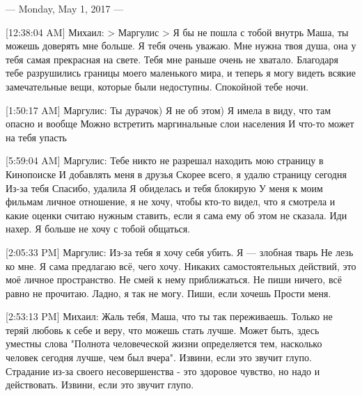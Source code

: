 \documentclass{article}
\begin{document}
\title{}
\author{}
\date{}
\maketitle


--- Monday, May 1, 2017 ---

[12:38:04 AM] Михаил:
> Маргулис
> Я бы не пошла с тобой внутрь
Маша, ты можешь доверять мне больше. Я тебя очень уважаю. Мне нужна твоя душа, она у тебя самая прекрасная на свете. Тебя мне раньше очень не хватало. Благодаря тебе разрушились границы моего маленького мира, и теперь я могу видеть всякие замечательные вещи, которые были недоступны.
 Спокойной тебе ночи.

[1:50:17 AM] Маргулис:
Ты дурачок)
 Я не об этом)
 Я имела в виду, что там опасно и вообще
 Можно встретить маргинальные слои населения
 И что-то может на тебя упасть

[5:59:04 AM] Маргулис:
Тебе никто не разрешал находить мою страницу в Кинопоиске
 И добавлять меня в друзья
 Скорее всего, я удалю страницу сегодня
 Из-за тебя
 Спасибо, удалила
 Я обиделась и тебя блокирую
 У меня к моим фильмам личное отношение, я не хочу, чтобы кто-то видел, что я смотрела и какие оценки считаю нужным ставить, если я сама ему об этом не сказала. Иди нахер. Я больше не хочу с тобой общаться.

[2:05:33 PM] Маргулис:
Из-за тебя я хочу себя убить.
 Я — злобная тварь
 Не лезь ко мне. Я сама предлагаю всё, чего хочу. Никаких самостоятельных действий, это моё личное пространство. Не смей к нему приближаться.
 Не пиши ничего, всё равно не прочитаю.
 Ладно, я так не могу.
 Пиши, если хочешь
 Прости меня.

[2:53:13 PM] Михаил:
Жаль тебя, Маша, что ты так переживаешь. Только не теряй любовь к себе и веру, что можешь стать лучше. Может быть, здесь уместны слова "Полнота человеческой жизни определяется тем, насколько человек сегодня лучше, чем был вчера". Извини, если это звучит глупо. 
Страдание из-за своего несовершенства - это здоровое чувство, но надо и действовать. Извини, если это звучит глупо.
\end{document}
